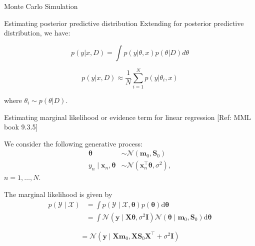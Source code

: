 \documentclass{beamer}
\begin{document}
\begin{section}{Monte Carlo Simulation}
    \begin{frame}{Estimating posterior predictive distribution}
        Extending for posterior predictive distribution, we have:

        \pause \begin{equation}
            p(y|x, D) = \int p(y|\theta, x) p(\theta|D) d\theta 
        \end{equation}

        \pause \begin{equation}
            p(y|x, D) \approx \frac{1}{N} \sum_{i=1}^{N} p(y|\theta_i, x)
        \end{equation}

        \pause where $\theta_i \sim p(\theta|D)$.
        
    \end{frame}

    \begin{frame}{Estimating marginal likelihood or evidence term for linear regression}
        [Ref: MML book 9.3.5]

        We consider the following generative process:
$$
\begin{aligned}
\boldsymbol{\theta} & \sim \mathcal{N}\left(\boldsymbol{m}_0, \boldsymbol{S}_0\right) \\
y_n \mid \boldsymbol{x}_n, \boldsymbol{\theta} & \sim \mathcal{N}\left(\boldsymbol{x}_n^{\top} \boldsymbol{\theta}, \sigma^2\right),
\end{aligned}
$$
$n=1, \ldots, N$. 

\pause The marginal likelihood is given by
$$
\begin{aligned}
p(\mathcal{Y} \mid \mathcal{X}) & =\int p(\mathcal{Y} \mid \mathcal{X}, \boldsymbol{\theta}) p(\boldsymbol{\theta}) \mathrm{d} \boldsymbol{\theta} \\
& =\int \mathcal{N}\left(\boldsymbol{y} \mid \boldsymbol{X} \boldsymbol{\theta}, \sigma^2 \boldsymbol{I}\right) \mathcal{N}\left(\boldsymbol{\theta} \mid \boldsymbol{m}_0, \boldsymbol{S}_0\right) \mathrm{d} \boldsymbol{\theta}
\end{aligned}
$$

\pause \begin{equation}
    =\mathcal{N}\left(\boldsymbol{y} \mid \boldsymbol{X} \boldsymbol{m}_0, \boldsymbol{X} \boldsymbol{S}_0 \boldsymbol{X}^{\top}+\sigma^2 \boldsymbol{I}\right)
    \end{equation}
        
    \end{frame}


\end{section}
\end{document}
